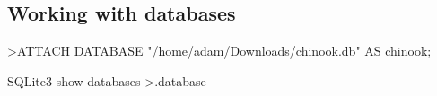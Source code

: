 
\subsection{Working with databases}

>ATTACH DATABASE "/home/adam/Downloads/chinook.db" AS chinook;

SQLite3 show databases
>.database
